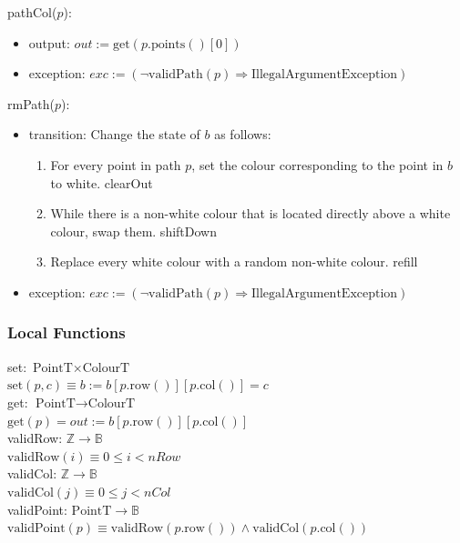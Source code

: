 \documentclass[12pt]{article}
\newcommand{\Implies}{\Rightarrow}
\begin{document}
\noindent pathCol($p$):
\begin{itemize}
	\item output: $out := \mbox{get}(p.\mbox{points}()[0])$
	\item exception: $exc := (\lnot \mbox{validPath}(p	) \Implies \mbox{IllegalArgumentException})$
\end{itemize}

\noindent rmPath($p$):
\begin{itemize}
	\item transition: Change the state of $b$ as follows:
		\begin{enumerate}
			\item For every point in path $p$, set the colour corresponding to the point in $b$ to white. clearOut
			\item While there is a non-white colour that is located directly above a white colour, swap them. shiftDown
			\item Replace every white colour with a random non-white colour. refill
		\end{enumerate}
	\item exception: $exc := (\lnot \mbox{validPath}(p) \Implies \mbox{IllegalArgumentException})$
\end{itemize}

\subsubsection* {Local Functions}

\noindent set: $\mbox{PointT} \times \mbox{ColourT}$\\
\noindent $\mbox{set}(p, c) \equiv b := b[p.\mbox{row}()][p.\mbox{col}()] = c$\\

\noindent get: $\mbox{PointT} \rightarrow \mbox{ColourT}$\\
\noindent $\mbox{get}(p) = out := b[p.\mbox{row}()][p.\mbox{col}()]$\\

\noindent validRow: $\mathbb{Z} \rightarrow \mathbb{B}$\\
\noindent $\mbox{validRow}(i) \equiv 0 \le i < nRow$\\

\noindent validCol: $\mathbb{Z} \rightarrow \mathbb{B}$\\
\noindent $\mbox{validCol}(j) \equiv 0 \le j < nCol$\\

\noindent validPoint: $\mbox{PointT} \rightarrow \mathbb{B}$\\
\noindent $\mbox{validPoint}(p) \equiv \mbox{validRow}(p.\mbox{row}()) \land \mbox{validCol}(p.\mbox{col}())$\\
\end{document}
